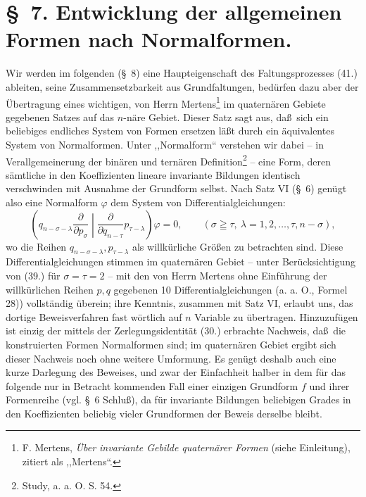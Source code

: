 \section*{\S\ 7. Entwicklung der allgemeinen Formen nach Normalformen.}
Wir werden im folgenden (\S\ 8) eine Haupteigenschaft des Faltungsprozesses (41.) ableiten, seine Zusammensetzbarkeit aus Grundfaltungen, bed\"urfen dazu aber der \"Ubertragung eines wichtigen, von Herrn Mertens\footnote{F. Mertens, \emph{\"Uber invariante Gebilde quatern\"arer Formen} (siehe Einleitung), zitiert als ,,Mertens``.} im quatern\"aren Gebiete gegebenen Satzes auf das $n$-n\"are Gebiet. Dieser Satz sagt aus, da\ss\ sich ein beliebiges endliches System von Formen ersetzen l\"a\ss t durch ein \"aquivalentes System von Normalformen. Unter ,,Normalform`` verstehen wir dabei -- in Verallgemeinerung der bin\"aren und tern\"aren Definition\footnote{Study, a. a. O. S. 54.} -- eine Form, deren s\"amtliche in den Koeffizienten lineare invariante Bildungen identisch verschwinden mit Ausnahme der Grundform selbst. Nach Satz VI (\S\ 6) gen\"ugt also eine Normalform $\varphi$ dem System von Differentialgleichungen:
\begin{equation}
 \left(q_{n-\sigma-\lambda}\frac{\partial}{\partial p_\sigma}\middle|\frac{\partial}{\partial q_{n-\tau}}p_{\tau-\lambda}\right)\varphi=0,
 \qquad(\sigma\geqq\tau,\ \lambda=1,2,\ldots,\tau,n-\sigma),
\tag{46}
\end{equation}
wo die Reihen $q_{n-\sigma-\lambda},p_{\tau-\lambda}$ als willk\"urliche Gr\"o\ss en zu betrachten sind. Diese Differentialgleichungen stimmen im quatern\"aren Gebiet -- unter Ber\"ucksichtigung von (39.) f\"ur $\sigma=\tau=2$ -- mit den von Herrn Mertens ohne Einf\"uhrung der willk\"urlichen Reihen $p,q$ gegebenen 10 Differentialgleichungen (a. a. O., Formel 28)) vollst\"andig \"uberein; ihre Kenntnis, zusammen mit Satz VI, erlaubt uns, das dortige Beweisverfahren fast w\"ortlich auf $n$ Variable zu \"ubertragen. Hinzuzuf\"ugen ist einzig der mittels der Zerlegungsidentit\"at (30.) erbrachte Nachweis, da\ss\ die konstruierten Formen Normalformen sind; im quatern\"aren Gebiet ergibt sich dieser Nachweis noch ohne weitere Umformung. Es gen\"ugt deshalb auch eine kurze Darlegung des Beweises, und zwar der Einfachheit halber in dem f\"ur das folgende nur in Betracht kommenden Fall einer einzigen Grundform $f$ und ihrer Formenreihe (vgl. \S\ 6 Schlu\ss), da f\"ur invariante Bildungen beliebigen Grades in den Koeffizienten beliebig vieler Grundformen der Beweis derselbe bleibt.

